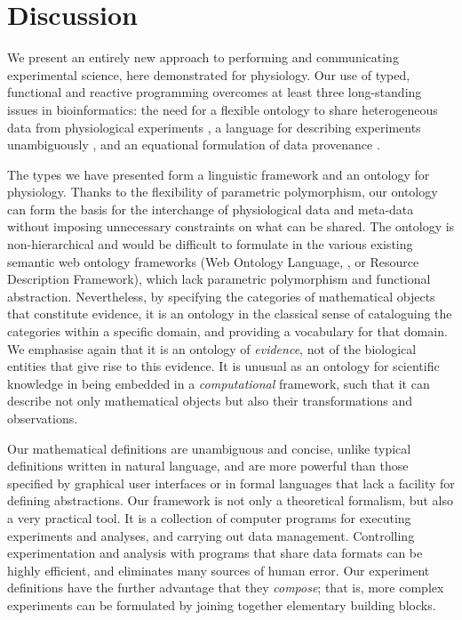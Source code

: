 \section*{Discussion}

We present an entirely new approach to performing and communicating
experimental science, here demonstrated for physiology.  Our use of
typed, functional and reactive programming overcomes at least three
long-standing issues in bioinformatics: the need for a flexible
ontology to share heterogeneous data from physiological experiments
\citep{Amari2002}, a language for describing experiments unambiguously
\citep{Murray-Rust2002}, and an equational formulation of data
provenance \citep{Pool2002}. 

The types we have presented form a linguistic framework and an
ontology for physiology. Thanks to the flexibility of parametric polymorphism,
our ontology can form the basis for the interchange of physiological data
and meta-data without imposing unnecessary constraints on what can be
shared. The ontology is non-hierarchical and would be difficult to
formulate in the various existing semantic web ontology frameworks
(Web Ontology Language, \citealt{owlref}, or Resource Description Framework), which lack
parametric polymorphism and functional abstraction. Nevertheless, by
specifying the categories of mathematical objects that constitute
evidence, it is an ontology in the classical sense of cataloguing the
categories within a specific domain, and providing a vocabulary for
that domain. We emphasise again that it is an ontology of
\emph{evidence}, not of the biological entities that give rise to this
evidence. It is unusual as an ontology for scientific knowledge in
being embedded in a \emph{computational} framework, such that it can
describe not only mathematical objects but also their transformations
and observations.

%
% 
%
Our mathematical definitions are unambiguous and concise, unlike
typical definitions written in natural language,
and are more powerful than those specified
by graphical user interfaces or in formal languages that lack a
facility for defining abstractions. Our framework is not only a
theoretical formalism, but also a very practical tool. It is a
collection of computer programs for executing experiments and
analyses, and carrying out data management. Controlling
experimentation and analysis with programs that share data formats can
be highly efficient, and eliminates many sources of human error. Our
experiment definitions have the further advantage that they
\emph{compose}; that is, more complex experiments can be formulated by
joining together elementary building blocks. 

